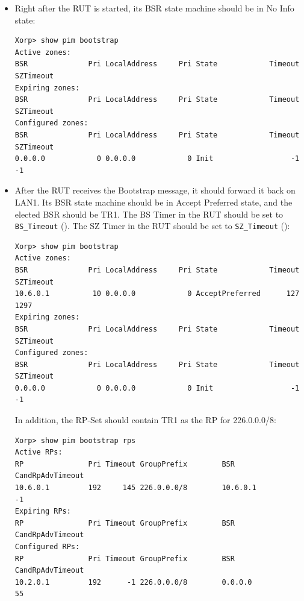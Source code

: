 \documentclass[11pt]{report}
\begin{document}
\begin{itemize}

  \item Right after the RUT is started, its BSR state machine should be in
  No Info state:

\begin{verbatim}
Xorp> show pim bootstrap 
Active zones:
BSR              Pri LocalAddress     Pri State            Timeout SZTimeout
Expiring zones:
BSR              Pri LocalAddress     Pri State            Timeout SZTimeout
Configured zones:
BSR              Pri LocalAddress     Pri State            Timeout SZTimeout
0.0.0.0            0 0.0.0.0            0 Init                  -1        -1
\end{verbatim}

  \item After the RUT receives the Bootstrap message, it should forward it
        back on LAN1. Its BSR state machine
        should be in Accept Preferred state, and the elected BSR should be TR1.
        The BS Timer in the RUT should be set to \verb=BS_Timeout=
        ({\PimsmBSTimeout}).
        The SZ Timer in the RUT should be set to \verb=SZ_Timeout=
        ({\PimsmSZTimeout}):

\begin{verbatim}
Xorp> show pim bootstrap 
Active zones:
BSR              Pri LocalAddress     Pri State            Timeout SZTimeout
10.6.0.1          10 0.0.0.0            0 AcceptPreferred      127      1297
Expiring zones:
BSR              Pri LocalAddress     Pri State            Timeout SZTimeout
Configured zones:
BSR              Pri LocalAddress     Pri State            Timeout SZTimeout
0.0.0.0            0 0.0.0.0            0 Init                  -1        -1
\end{verbatim}

  In addition, the RP-Set should contain TR1 as the RP for 226.0.0.0/8:

\begin{verbatim}
Xorp> show pim bootstrap rps 
Active RPs:
RP               Pri Timeout GroupPrefix        BSR         CandRpAdvTimeout
10.6.0.1         192     145 226.0.0.0/8        10.6.0.1                  -1
Expiring RPs:
RP               Pri Timeout GroupPrefix        BSR         CandRpAdvTimeout
Configured RPs:
RP               Pri Timeout GroupPrefix        BSR         CandRpAdvTimeout
10.2.0.1         192      -1 226.0.0.0/8        0.0.0.0                   55
\end{verbatim}

\end{itemize}
\end{document}
